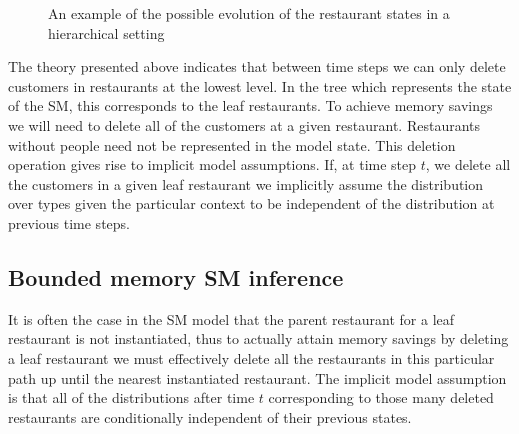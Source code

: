 \begin{figure}[t] 
	\begin{center}
		\caption{An example of the possible evolution of the restaurant states in a hierarchical setting}
	\end{center} 
	\label{figResultsCC}
\end{figure} 

The theory presented above indicates that between time steps we can only delete customers in restaurants at the lowest level.  In the tree which represents the state of the SM, this corresponds to the leaf restaurants.  To achieve memory savings we will need to delete all of the customers at a given restaurant.  Restaurants without people need not be represented in the model state.  This deletion operation gives rise to implicit model assumptions. If, at time step $t$, we delete all the customers in a given leaf restaurant we implicitly assume the distribution over types given the particular context to be independent of the distribution at previous time steps.

\subsection{Bounded memory SM inference}

It is often the case in the SM model that the parent restaurant for a leaf restaurant is not instantiated, thus to actually attain memory savings by deleting a leaf restaurant we must effectively delete all the restaurants in this particular path up until the nearest instantiated restaurant.  The implicit model assumption is that all of the distributions after time $t$ corresponding to those many deleted restaurants are conditionally independent of their previous states.

